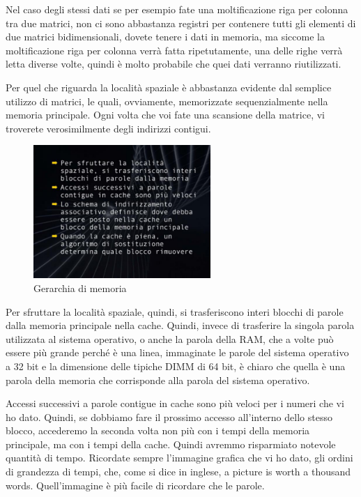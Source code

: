 Nel caso degli stessi dati se per esempio fate una moltificazione riga per colonna tra due matrici, non ci sono abbastanza registri per contenere tutti gli elementi di due matrici bidimensionali, dovete tenere i dati in memoria, ma siccome la moltificazione riga per colonna verrà fatta ripetutamente, una delle righe verrà letta diverse volte, quindi è molto probabile che quei dati verranno riutilizzati.

Per quel che riguarda la località spaziale è abbastanza evidente dal semplice utilizzo di matrici, le quali, ovviamente, memorizzate sequenzialmente nella memoria principale. Ogni volta che voi fate una scansione della matrice, vi troverete verosimilmente degli indirizzi contigui.

\FloatBarrier
\begin{figure}[H]
  \centering
  \includegraphics[width=0.60\textwidth,
                    trim=20 20 10 20, %
                    clip]
                    {images/Lez06_p03_fig_04.png}
  \caption{Gerarchia di memoria}
  \label{fig:Lez06_p03_fig_04}
\end{figure}
\FloatBarrier
\noindent


Per sfruttare la località spaziale, quindi, si trasferiscono interi blocchi di parole dalla memoria principale nella cache.
Quindi, invece di trasferire la singola parola utilizzata al sistema operativo, o anche la parola della RAM, che a volte può essere più grande perché è una linea, immaginate le parole del sistema operativo a 32 bit e la dimensione delle tipiche DIMM di 64 bit, è chiaro che quella è una parola della memoria che corrisponde alla parola del sistema operativo.

Accessi successivi a parole contigue in cache sono più veloci per i numeri che vi ho dato.
Quindi, se dobbiamo fare il prossimo accesso all'interno dello stesso blocco, accederemo la seconda volta non più con i tempi della memoria principale, ma con i tempi della cache. Quindi avremmo risparmiato notevole quantità di tempo.
Ricordate sempre l'immagine grafica che vi ho dato, gli ordini di grandezza di tempi, che, come si dice in inglese, a picture is worth a thousand words. Quell'immagine è più facile di ricordare che le parole.

